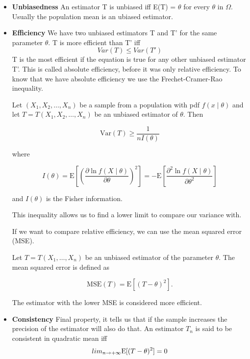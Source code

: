 \begin{itemize}
    \item \textbf{Unbiasedness} \ra An estimator T is unbiased iff E(T) = $\theta$ for every $\theta$ in $\Omega$. Usually the population mean is an ubiased estimator.
    \item \textbf{Efficiency} \ra We have two unbiased estimators T and T' for the same parameter $\theta$. T is more efficient than T' iff
    \begin{equation}
        Var(T) \le Var(T')
    \end{equation}
    T is the most efficient if the equation is true for any other unbiased estimator T'.
    This is called absolute efficiency, before it was only relative efficiency.
    To know that we have absolute efficiency we use the Frechet-Cramer-Rao inequality.

    Let $(X_1, X_2, \dots, X_n)$ be a sample from a population with pdf $f(x \mid \theta)$ and let
$T = T(X_1, X_2, \dots, X_n)$ be an unbiased estimator of $\theta$. Then

\[
\mathrm{Var}(T) \geq \frac{1}{n I(\theta)}
\]

where

\[
I(\theta) = \mathrm{E} \left[ \left( \frac{\partial \ln f(X \mid \theta)}{\partial \theta} \right)^2 \right]
= - \mathrm{E} \left[ \frac{\partial^2 \ln f(X \mid \theta)}{\partial \theta^2} \right]
\]

and $I(\theta)$ is the Fisher information.
\vspace{10pt}

This inequality allows us to find a lower limit to compare our variance with. 

\vspace{10pt}

If we want to compare relative efficiency, we can use the mean squared error (MSE). 

Let $T = T(X_1, \dots, X_n)$ be an unbiased estimator of the parameter $\theta$. The mean squared error is defined as

\begin{equation}
    \mathrm{MSE}(T) = \mathrm{E}[(T - \theta)^2].
\end{equation}

The estimator with the lower MSE is considered more efficient.

\item \textbf{Consistency} \ra Final property, it tells us that if the sample increases the precision of the estimator will also do that. An estimator $T_n$ is said to be consistent in quadratic mean iff 
\begin{equation}
    lim_{n \rightarrow + \infty} \mathrm{E}[(T - \theta)^2] = 0
\end{equation}

\end{itemize}

